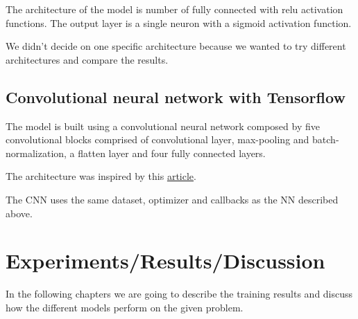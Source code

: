 \documentclass{article}
\begin{document}
The architecture of the model is number of fully connected with relu activation functions.
The output layer is a single neuron with a sigmoid activation function.

We didn't decide on one specific architecture because we wanted to try different architectures and 
compare the results.

\subsection{Convolutional neural network with Tensorflow}
\label{sec:convolutional_neural_network_with_tensorflow}

The model is built using a convolutional neural network composed by five convolutional blocks comprised of convolutional layer, 
max-pooling and batch-normalization, a flatten layer and four fully connected layers.

The architecture was inspired by this \href{https://towardsdatascience.com/deep-learning-for-detecting-pneumonia-from-x-ray-images-fc9a3d9fdba8}{article}.

The CNN uses the same dataset, optimizer and callbacks as the NN described above.

\section{Experiments/Results/Discussion}

In the following chapters we are going to describe the training results and discuss how the 
different models perform on the given problem.
\end{document}

